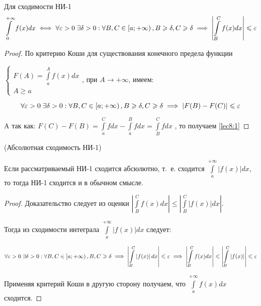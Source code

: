 \documentclass[../../main.tex]{subfiles}
\begin{document}
\begin {thm}
Для сходимости НИ-1
 \begin{equation} \label{lec8:1}
  \int\limits_{0}^{+\infty} f(x)dx \iff \forall \varepsilon > 0 \;  \exists \delta > 0 : \forall B, C \in \left[a; +\infty\right), B \geqslant \delta, C \geqslant \delta \implies \left| \int\limits_{B}^{C} f(x)dx \right| \leqslant \varepsilon
 \end{equation}
\end {thm}

\begin{proof}
По критерию Коши для существования конечного предела функции
 
$\begin{cases}
  F(A) = \displaystyle\int\limits_{a}^{A}f(x)dx\\
  A \geq a
 \end{cases}$, при $A \to +\infty$, имеем:
 
 \[\forall \varepsilon > 0 \; \exists \delta > 0 : \forall B, C \in \left[a; +\infty \right), B \geqslant \delta, C \geqslant \delta \implies \left|F(B) - F(C) \right| \leqslant \varepsilon\]
 
 A так как:
 $F(C) - F(B) = \displaystyle\int\limits_{a}^{C}fdx - \displaystyle\int\limits_{a}^{B}fdx = \int\limits_{B}^{C}fdx$
 , то получаем \eqref{lec8:1}
\end{proof}

\begin{crl}
 (Абсолютная сходимость НИ-1)
 
 Если рассматриваемый НИ-1 сходится абсюлютно, т.~е. сходится
 $\displaystyle\int\limits_{a}^{+\infty}|f(x)|dx$, то тогда НИ-1 сходится и в обычном смысле.
 
 \begin{proof}
 Доказательство следует из оценки
$\left|\displaystyle\int\limits_{B}^{C}f(x)dx \right| \leq \left|\displaystyle\int\limits_{B}^{C}|f(x)|dx \right|$.

Тогда из сходимости интеграла $\displaystyle\int\limits_{a}^{+\infty}\left| f(x) \right| dx $ следует:

\[\forall \varepsilon > 0 \; \exists \delta > 0 : \forall B, C \in \left[a; +\infty \right), B, C \geqslant \delta \implies \left| \int\limits_{B}^{C} \left| f(x) \right| dx \right| \leqslant \varepsilon \implies \left| \int\limits_{B}^{C} f(x) dx \right| \leqslant \left|\int\limits_{B}^{C} \left| f(x) \right| \right| \leqslant \varepsilon\]

Применяя критерий Коши в другую сторону получаем, что $\displaystyle\int\limits_{a}^{+\infty}f(x)dx$ сходится.

 \end{proof}    
\end{crl}
\end{document}
